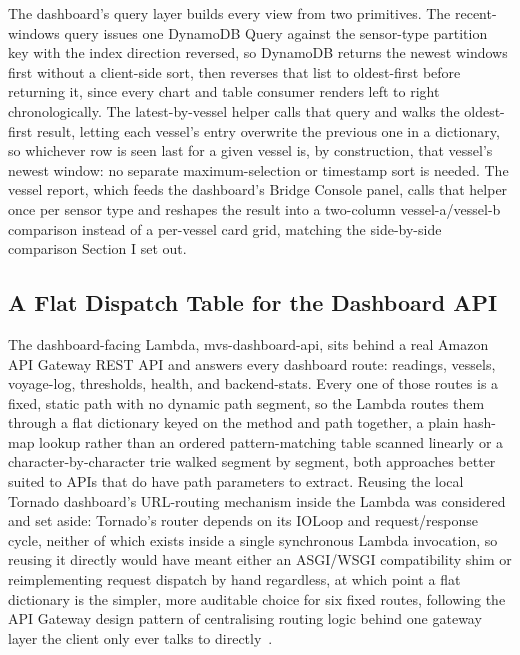 \documentclass[conference]{IEEEtran}
\begin{document}
The dashboard's query layer builds every view from two primitives. The recent-windows query issues one DynamoDB Query against the sensor-type partition key with the index direction reversed, so DynamoDB returns the newest windows first without a client-side sort, then reverses that list to oldest-first before returning it, since every chart and table consumer renders left to right chronologically. The latest-by-vessel helper calls that query and walks the oldest-first result, letting each vessel's entry overwrite the previous one in a dictionary, so whichever row is seen last for a given vessel is, by construction, that vessel's newest window: no separate maximum-selection or timestamp sort is needed. The vessel report, which feeds the dashboard's Bridge Console panel, calls that helper once per sensor type and reshapes the result into a two-column vessel-a/vessel-b comparison instead of a per-vessel card grid, matching the side-by-side comparison Section I set out.

\subsection{A Flat Dispatch Table for the Dashboard API}
The dashboard-facing Lambda, mvs-dashboard-api, sits behind a real Amazon API Gateway REST API and answers every dashboard route: readings, vessels, voyage-log, thresholds, health, and backend-stats. Every one of those routes is a fixed, static path with no dynamic path segment, so the Lambda routes them through a flat dictionary keyed on the method and path together, a plain hash-map lookup rather than an ordered pattern-matching table scanned linearly or a character-by-character trie walked segment by segment, both approaches better suited to APIs that do have path parameters to extract. Reusing the local Tornado dashboard's URL-routing mechanism inside the Lambda was considered and set aside: Tornado's router depends on its IOLoop and request/response cycle, neither of which exists inside a single synchronous Lambda invocation, so reusing it directly would have meant either an ASGI/WSGI compatibility shim or reimplementing request dispatch by hand regardless, at which point a flat dictionary is the simpler, more auditable choice for six fixed routes, following the API Gateway design pattern of centralising routing logic behind one gateway layer the client only ever talks to directly~\cite{ref8}.
\end{document}
